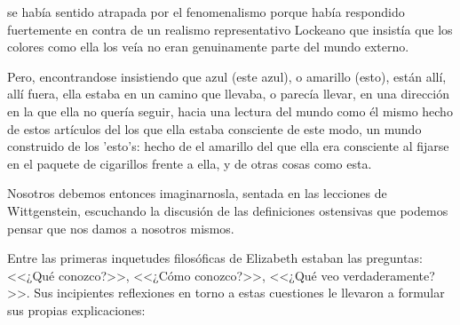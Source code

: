 se había sentido atrapada por el fenomenalismo porque había respondido
fuertemente en contra de un realismo representativo Lockeano que insistía que
los colores como ella los veía no eran genuinamente parte del mundo externo.

Pero, encontrandose insistiendo que azul (este azul), o amarillo (esto), están
allí, allí fuera, ella estaba en un camino que llevaba, o parecía llevar, en una
dirección en la que ella no quería seguir, hacia una lectura del mundo como él
mismo hecho de estos artículos del los que ella estaba consciente de este modo,
un mundo construido de los 'esto's: hecho de el amarillo del que ella era
consciente al fijarse en el paquete de cigarillos frente a ella, y de otras
cosas como esta.

Nosotros debemos entonces imaginarnosla, sentada en las lecciones de
Wittgenstein, escuchando la discusión de las definiciones ostensivas que podemos
pensar que nos damos a nosotros mismos.




Entre las primeras inquetudes filosóficas de Elizabeth estaban las preguntas:
<<¿Qué conozco?>>, <<¿Cómo conozco?>>, <<¿Qué veo verdaderamente?>>. Sus
incipientes reflexiones en torno a estas cuestiones le llevaron a formular sus
propias explicaciones:

